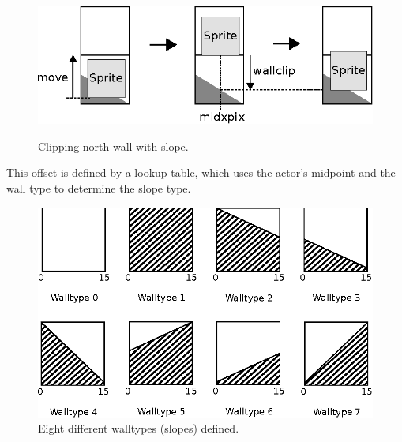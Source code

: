 \documentclass[book.tex]{subfiles}
\begin{document}
\begin{figure}[H]
  \centering
  \includegraphics[width=\textwidth]{imgs/drawings/clipping_north.eps}
  \label{fig:clipping_north}
  \caption{Clipping north wall with slope.}
\end{figure}

This offset is defined by a lookup table, which uses the actor's midpoint and the wall type to determine the slope type.\\

\begin{minipage}{\textwidth}
  
\end{minipage}
\label{wallclip_array}
\par
\begin{figure}[H]
  \centering
  \includegraphics[width=\textwidth]{imgs/drawings/walltype.eps}
  \caption{Eight different walltypes (slopes) defined.}
  \label{fig:walltype}
\end{figure}



\par
\begin{minipage}{\textwidth}
  
\end{minipage}
\label{wallclip_array}
\par
\end{document}
